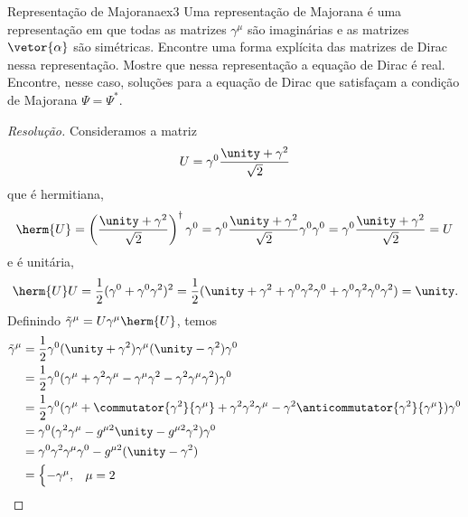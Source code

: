 \begin{exercício}{Representação de Majorana}{ex3}
    Uma representação de Majorana é uma representação em que todas as matrizes \(\gamma^\mu\) são imaginárias e as matrizes \(\vetor{\alpha}\) são simétricas. Encontre uma forma explícita das matrizes de Dirac nessa representação. Mostre que nessa representação a equação de Dirac é real. Encontre, nesse caso, soluções para a equação de Dirac que satisfaçam a condição de Majorana \(\Psi = \Psi^*\).
\end{exercício}
\begin{proof}[Resolução]
    Consideramos a matriz
    \begin{equation*}
        U = \gamma^0\frac{\unity + \gamma^2}{\sqrt{2}}
    \end{equation*}
    que é hermitiana,
    \begin{equation*}
        \herm{U} = \left(\frac{\unity + \gamma^2}{\sqrt{2}}\right)^\dagger \gamma^0 = \gamma^0\frac{\unity + \gamma^2}{\sqrt{2}}\gamma^0 \gamma^0 = \gamma^0 \frac{\unity + \gamma^2}{\sqrt{2}} = U
    \end{equation*}
    e é unitária,
    \begin{equation*}
        \herm{U}U = \frac12 (\gamma^0 + \gamma^0 \gamma^2)^2 = \frac12 (\unity + \gamma^2 + \gamma^0 \gamma^2 \gamma^0 + \gamma^0 \gamma^2 \gamma^0 \gamma^2) = \unity.
    \end{equation*}
    Definindo \(\tilde{\gamma}^\mu = U \gamma^\mu \herm{U}\), temos
    \begin{align*}
        \tilde{\gamma}^\mu &= \frac12 \gamma^0 (\unity + \gamma^2) \gamma^\mu (\unity - \gamma^2) \gamma^0\\
                           &= \frac12 \gamma^0 (\gamma^\mu + \gamma^2 \gamma^\mu - \gamma^\mu \gamma^2 - \gamma^2 \gamma^\mu \gamma^2) \gamma^0\\
                           &= \frac12 \gamma^0 (\gamma^\mu + \commutator{\gamma^2}{\gamma^\mu} + \gamma^2 \gamma^2 \gamma^\mu - \gamma^2 \anticommutator{\gamma^2}{\gamma^\mu})\gamma^0\\
                           &= \gamma^0 (\gamma^2 \gamma^\mu - g^{\mu 2} \unity - g^{\mu 2}\gamma^2)\gamma^0\\
                           &= \gamma^0 \gamma^2 \gamma^\mu \gamma^0 - g^{\mu2} (\unity - \gamma^2)\\
                           &= \begin{cases}
                               -\gamma^\mu,&\mu = 2\\

\end{cases}
\end{align*}
\end{proof}
